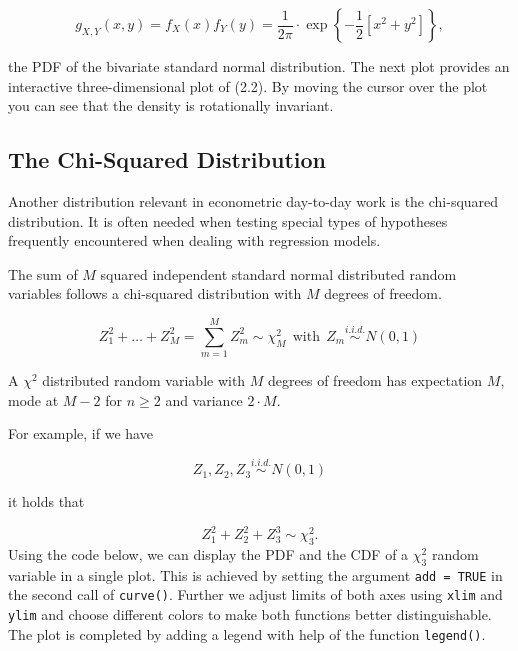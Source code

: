 \documentclass[]{book}
\theoremstyle{definition}
\theoremstyle{definition}
\theoremstyle{definition}
\theoremstyle{remark}
\begin{document}
\[ g_{X,Y}(x,y) = f_X(x) f_Y(y) = \frac{1}{2\pi} \cdot \exp \left\{ -\frac{1}{2} \left[x^2 + y^2 \right]  \right\}, \tag{2.2}  \]

the PDF of the bivariate standard normal distribution. The next plot
provides an interactive three-dimensional plot of (2.2). By moving the
cursor over the plot you can see that the density is rotationally
invariant.

\subsection*{The Chi-Squared
Distribution}\label{the-chi-squared-distribution}

Another distribution relevant in econometric day-to-day work is the
chi-squared distribution. It is often needed when testing special types
of hypotheses frequently encountered when dealing with regression
models.

The sum of \(M\) squared independent standard normal distributed random
variables follows a chi-squared distribution with \(M\) degrees of
freedom.

\[ Z_1^2 + \dots + Z_M^2 = \sum_{m=1}^M Z_m^2 \sim \chi^2_M \ \ \text{with} \ \ Z_m \overset{i.i.d.}{\sim} N(0,1) \label{eq:chisq}\]

A \(\chi^2\) distributed random variable with \(M\) degrees of freedom
has expectation \(M\), mode at \(M-2\) for \(n \geq 2\) and variance
\(2 \cdot M\).

For example, if we have

\[ Z_1,Z_2,Z_3 \overset{i.i.d.}{\sim} N(0,1) \]

it holds that

\[ Z_1^2+Z_2^2+Z_3^3 \sim \chi^2_3. \tag{2.3} \] Using the code below,
we can display the PDF and the CDF of a \(\chi^2_3\) random variable in
a single plot. This is achieved by setting the argument
\texttt{add = TRUE} in the second call of \texttt{curve()}. Further we
adjust limits of both axes using \texttt{xlim} and \texttt{ylim} and
choose different colors to make both functions better distinguishable.
The plot is completed by adding a legend with help of the function
\texttt{legend()}.
\end{document}
